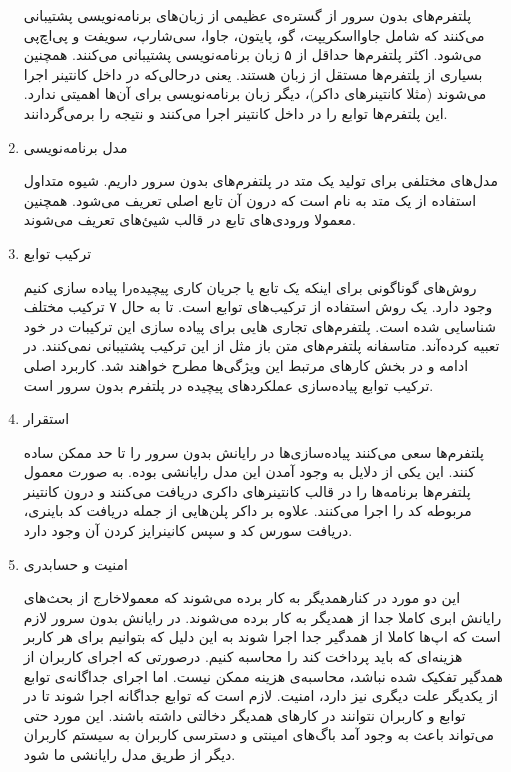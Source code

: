 \begin{enumerate}
	 پلتفرم‌های بدون سرور از گستره‌ی عظیمی از زبان‌های برنامه‌نویسی پشتیبانی می‌کنند که شامل جاوااسکریپت، گو، پایتون، جاوا، سی‌شارپ، سویفت و پی‌اچ‌پی می‌شود. اکثر پلتفرم‌ها حداقل از ۵ زبان برنامه‌نویسی پشتیبانی می‌کنند. همچنین بسیاری از پلتفرم‌ها مستقل از زبان هستند. یعنی درحالی‌که در داخل کانتینر‌ اجرا می‌شوند (مثلا کانتینر‌های داکر)، دیگر زبان برنامه‌نویسی برای آن‌ها اهمیتی ندارد. این پلتفرم‌ها توابع را در داخل کانتینر اجرا می‌کنند و نتیجه را برمی‌گردانند. 
	 
	 \par
	 \item مدل برنامه‌نویسی 
	 
	 مدل‌های مختلفی برای تولید یک متد در پلتفرم‌های بدون سرور داریم. شیوه متداول استفاده از یک متد به نام  است که درون آن تابع اصلی تعریف می‌شود. همچنین معمولا ورودی‌های تابع در قالب شیئ‌های  تعریف می‌شوند. 
	 
	 \par
	 \item ترکیب توابع
	 
	 روش‌های گوناگونی برای اینکه یک تابع‌ یا جریان کاری پیچیده‌را پیاده سازی کنیم وجود دارد. یک روش استفاده از ترکیب‌های توابع است.  تا به حال ۷ ترکیب مختلف شناسایی شده است. پلتفرم‌های تجاری هایی برای پیاده سازی این ترکیبات در خود تعبیه کرده‌آند. متاسفانه پلتفرم‌های متن باز مثل  از این ترکیب پشتیبانی نمی‌کنند. در ادامه و در بخش کار‌های مرتبط این ویژگی‌ها مطرح خواهند شد.  کاربرد اصلی ترکیب توابع پیاده‌سازی عملکرد‌های پیچیده در پلتفرم‌ بدون سرور است.
	 
	 \par
	 \item استقرار
	 
	 پلتفرم‌ها سعی می‌کنند پیاده‌سازی‌ها در رایانش بدون سرور را تا حد ممکن ساده کنند. این یکی از دلایل به وجود آمدن این مدل رایانشی بوده. به صورت معمول پلتفرم‌ها برنامه‌ها را در قالب کانتینر‌های داکری دریافت می‌کنند و درون کانتینر مربوطه کد را اجرا می‌کنند. علاوه بر داکر پلن‌هایی از جمله دریافت کد باینری، دریافت سورس کد و سپس کانینرایز کردن آن وجود دارد.
	 
	 \item امنیت و حسابدری
	 
	 این دو مورد در کنارهمدیگر به کار برده می‌شوند که معمولاخارج از بحث‌های رایانش ابری کاملا جدا از همدیگر به کار برده می‌شوند. در رایانش بدون سرور لازم است که اپ‌ها کاملا از همدگیر جدا اجرا شوند به این دلیل که بتوانیم برای هر کاربر هزینه‌ای که باید پرداخت کند را محاسبه کنیم. درصورتی که اجرای کاربران از همدگیر تفکیک شده نباشد، محاسبه‌ی هزینه ممکن نیست. اما اجرای جداگانه‌ی توابع از یکدیگر علت دیگری نیز دارد، امنیت. لازم است که توابع جداگانه اجرا شوند تا در توابع و کاربران نتوانند در کار‌های همدیگر دخالتی داشته باشند. این مورد حتی می‌تواند باعث به وجود آمد باگ‌های امینتی و دسترسی کاربران به سیستم کاربران دیگر از طریق مدل رایانشی ما شود.
	 

\end{enumerate}
